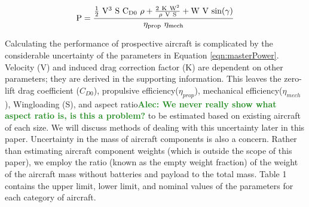 \documentclass{achemso}
\newcommand{\ab}[1]{{\textbf{\textcolor{ForestGreen}{Alec: #1}}}}
\begin{document}
\begin{equation}\label{eqn:masterPower}
    \centering
    \mathrm{P = \frac{\frac{1}{2}\ V^3\ S\ C_{D0}\ \rho + \frac{2\ K\ W^2}{\rho\ V\ S} + W\ V\ sin(\gamma)}{\eta_{prop}\ \eta_{mech} }}
\end{equation}

Calculating the performance of prospective aircraft is complicated by the considerable uncertainty of the parameters in Equation \eqref{eqn:masterPower}. Velocity (V) and induced drag correction factor (K) are dependent on other parameters; they are derived in the supporting information. This leaves the zero-lift drag coefficient ($C_{D0}$), propulsive efficiency($\eta_{prop}$), mechanical efficiency($\eta_{mech}$), Wingloading (S), and aspect ratio\ab{We never really show what aspect ratio is, is this a problem?} to be estimated based on existing aircraft of each size. We will discuss methods of dealing with this uncertainty later in this paper. Uncertainty in the mass of aircraft components is also a concern. Rather than estimating aircraft component weights (which is outside the scope of this paper), we  employ the ratio (known as the empty weight fraction) of the weight of the aircraft mass without batteries and payload to the total mass. Table 1 contains the upper limit, lower limit, and nominal values of the parameters for each category of aircraft. 
\end{document}
